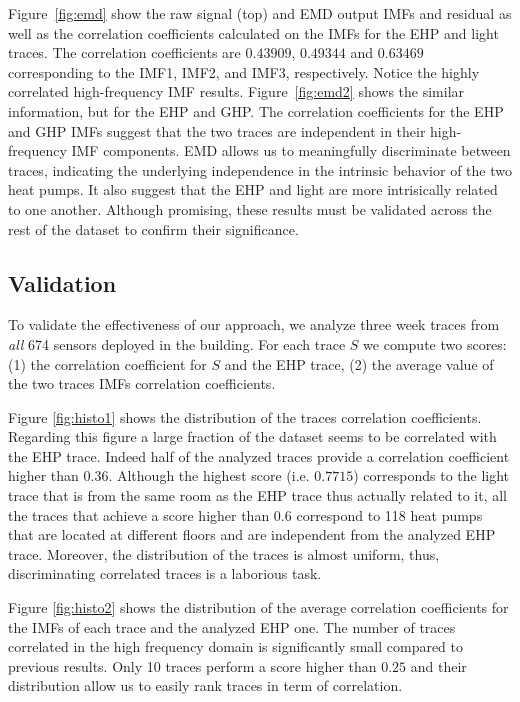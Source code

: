 Figure~\ref{fig:emd} show the raw signal (top) and EMD output IMFs and residual as well as the 
correlation coefficients calculated on the IMFs for the EHP and
light traces.  The correlation coefficients are $0.43909$, $0.49344$ and $0.63469$ corresponding to the IMF1, 
IMF2, and IMF3, respectively.  Notice the highly correlated high-frequency IMF results.
Figure~\ref{fig:emd2} shows the similar information, but for the EHP and GHP.
The correlation coefficients for the EHP and GHP IMFs suggest that the two traces are independent in their 
high-frequency IMF components.
EMD allows us to meaningfully discriminate between traces, indicating the underlying independence in the intrinsic
behavior of the two heat pumps.  It also suggest that the EHP and light are more intrisically related
to one another.  Although promising, these results must be validated across the rest of the
dataset to confirm their significance.

\subsection{Validation}
To validate the effectiveness of our approach, we analyze three week traces from \emph{all} 
674 sensors deployed in the building.
For each trace $S$ we compute two scores: (1) the correlation coefficient for $S$ and the EHP trace, (2) the average value of the two traces IMFs correlation coefficients.

Figure \ref{fig:histo1} shows the distribution of the traces correlation coefficients.
Regarding this figure a large fraction of the dataset seems to be correlated with the EHP trace.
Indeed half of the analyzed traces provide a correlation coefficient higher than $0.36$.
Although the highest score (i.e. $0.7715$) corresponds to the light trace that is from the same room as the EHP trace thus actually related to it, all the traces that achieve a score higher than $0.6$  correspond to 118 heat pumps that are located at different floors and are independent from the analyzed EHP trace.
Moreover, the distribution of the traces is almost uniform, thus, discriminating correlated traces is a laborious task.

Figure \ref{fig:histo2} shows the distribution of the average correlation coefficients for the IMFs of each trace and the analyzed EHP one.
The number of traces correlated in the high frequency domain is significantly small compared to previous results. 
Only 10 traces perform a score higher than $0.25$ and their distribution allow us to easily rank traces in term of correlation.

